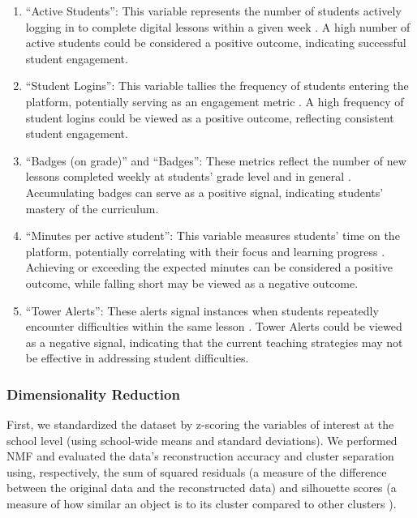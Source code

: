 \documentclass[
  number,
  preprint,
  3p,
  onecolumn]{elsarticle}
\begin{document}
\begin{enumerate}
\def\labelenumi{\arabic{enumi}.}
\item
  ``Active Students'': This variable represents the number of students
  actively logging in to complete digital lessons within a given week
  \citep{zearn2022}. A high number of active students could be
  considered a positive outcome, indicating successful student
  engagement.
\item
  ``Student Logins'': This variable tallies the frequency of students
  entering the platform, potentially serving as an engagement metric
  \citep{zearn2024}. A high frequency of student logins could be viewed
  as a positive outcome, reflecting consistent student engagement.
\item
  ``Badges (on grade)'' and ``Badges'': These metrics reflect the number
  of new lessons completed weekly at students' grade level and in
  general \citep{zearn2024a}. Accumulating badges can serve as a
  positive signal, indicating students' mastery of the curriculum.
\item
  ``Minutes per active student'': This variable measures students' time
  on the platform, potentially correlating with their focus and learning
  progress \citep{zearn2022}. Achieving or exceeding the expected
  minutes can be considered a positive outcome, while falling short may
  be viewed as a negative outcome.
\item
  ``Tower Alerts'': These alerts signal instances when students
  repeatedly encounter difficulties within the same lesson
  \citep{zearn2024b}. Tower Alerts could be viewed as a negative signal,
  indicating that the current teaching strategies may not be effective
  in addressing student difficulties.
\end{enumerate}

\subsubsection{Dimensionality
Reduction}\label{dimensionality-reduction-1}

First, we standardized the dataset by z-scoring the variables of
interest at the school level (using school-wide means and standard
deviations). We performed NMF and evaluated the data's reconstruction
accuracy and cluster separation using, respectively, the sum of squared
residuals (a measure of the difference between the original data and the
reconstructed data) and silhouette scores (a measure of how similar an
object is to its cluster compared to other clusters
\citep{rousseeuw1987}).
\end{document}

